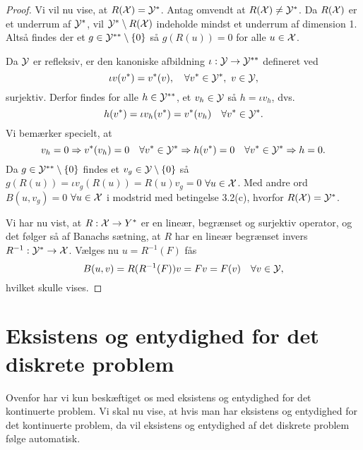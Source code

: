 \begin{proof}
Vi vil nu vise, at $R(\mathcal{X})=\mathcal{Y}^{\ast}$. Antag omvendt at
$R(\mathcal{X})\not=\mathcal{Y}^{\ast}$. Da $R(\mathcal{X})$ er et underrum af $\mathcal{Y}^{\ast}$, vil 
$\mathcal{Y}^{\ast}\setminus R(\mathcal{X})$ indeholde mindst et underrum af dimension
1. Altså findes der et $g\in\mathcal{Y}^{\ast\ast}\setminus\{0\}$ så
$g(R(u))=0$ for alle $u\in\mathcal{X}$.

Da $\mathcal{Y}$ er refleksiv, er den kanoniske afbildning 
$\iota:\mathcal{Y}\rightarrow\mathcal{Y}^{\ast\ast}$ defineret ved
\begin{equation}
  \iota v(v^{\ast}) = v^{\ast}(v), \quad 
  \forall v^{\ast}\in\mathcal{Y}^{\ast}, \ v\in\mathcal{Y} ,
\end{equation}  
surjektiv. Derfor findes for alle $h\in\mathcal{Y}^{\ast\ast}$, et $v_h\in\mathcal{Y}$ så
$h=\iota v_h$, dvs.
\begin{equation}
  h(v^{\ast}) = \iota v_h(v^{\ast}) = v^{\ast}(v_h) 
  \quad \forall v^{\ast}\in\mathcal{Y}^{\ast}.
\end{equation}
Vi bemærker specielt, at 
\begin{equation}
  v_h=0\Rightarrow v^{\ast}(v_h)=0 \quad \forall v^{\ast}\in\mathcal{Y}^{\ast}
  \Rightarrow h(v^{\ast})=0 \quad \forall v^{\ast}\in\mathcal{Y}^{\ast} \Rightarrow h=0.
\end{equation}
Da $g\in\mathcal{Y}^{\ast\ast}\setminus\{0\}$ findes et
$v_g\in\mathcal{Y}\setminus\{0\}$ så $g(R(u))=\iota v_g(R(u))=R(u)v_g=0$
$\forall u\in\mathcal{X}$. Med andre ord $B(u,v_g)=0$ $\forall u\in\mathcal{X}$ i
modstrid med betingelse 3.2(c), hvorfor $R(\mathcal{X})=\mathcal{Y}^{\ast}$.

Vi har nu vist, at $R:\mathcal{X}\rightarrow Y^{\ast}$ er en lineær, begrænset
og surjektiv operator, og det følger så af Banachs sætning, at $R$ har
en lineær begrænset invers $R^{-1}:\mathcal{Y}^{\ast}\rightarrow\mathcal{X}$. Vælges nu
$u=R^{-1}(F)$ fås
\begin{equation}
  B(u,v)=R(R^{-1}(F))v=Fv=F(v) \quad \forall v\in\mathcal{Y},
\end{equation} 
hvilket skulle vises.
\end{proof}

\section{Eksistens og entydighed for det diskrete pro\-blem}
Ovenfor har vi kun beskæftiget os med eksistens og entydighed for det
kontinuerte problem. Vi skal nu vise, at hvis man har eksistens og
entydighed for det kontinuerte problem, da vil eksistens og entydighed
af det diskrete problem følge automatisk.

